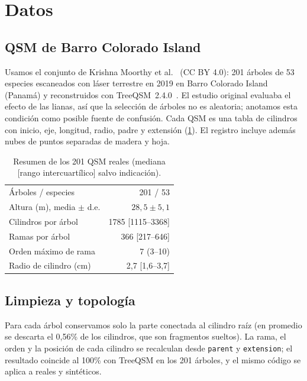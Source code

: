 \documentclass[11pt,a4paper]{article}
\begin{document}
\section{Datos}

\subsection{QSM de Barro Colorado Island}
Usamos el conjunto de Krishna Moorthy et al.~\cite{krishnamoorthy2022data} (CC BY 4.0): 201 árboles de 53 especies escaneados con láser terrestre en 2019 en Barro Colorado Island (Panamá) y reconstruidos con TreeQSM~2.4.0~\cite{raumonen2013treeqsm}. El estudio original evaluaba el efecto de las lianas, así que la selección de árboles no es aleatoria; anotamos esta condición como posible fuente de confusión. Cada QSM es una tabla de cilindros con inicio, eje, longitud, radio, padre y extensión (\cref{tab:datos}). El registro incluye además nubes de puntos separadas de madera y hoja.

\begin{table}[t]
\centering
\caption{Resumen de los 201 QSM reales (mediana [rango intercuartílico] salvo indicación).}
\label{tab:datos}
\begin{tabular}{lr}
\toprule
Árboles / especies & 201 / 53 \\
Altura (m), media $\pm$ d.e. & $28{,}5 \pm 5{,}1$ \\
Cilindros por árbol & 1785 [1115--3368] \\
Ramas por árbol & 366 [217--646] \\
Orden máximo de rama & 7 (3--10) \\
Radio de cilindro (cm) & 2,7 [1,6--3,7] \\
\bottomrule
\end{tabular}
\end{table}

\subsection{Limpieza y topología}\label{sec:limpieza}
Para cada árbol conservamos solo la parte conectada al cilindro raíz (en promedio se descarta el 0,56\% de los cilindros, que son fragmentos sueltos). La rama, el orden y la posición de cada cilindro se recalculan desde \texttt{parent} y \texttt{extension}; el resultado coincide al 100\% con TreeQSM en los 201 árboles, y el mismo código se aplica a reales y sintéticos.
\end{document}
